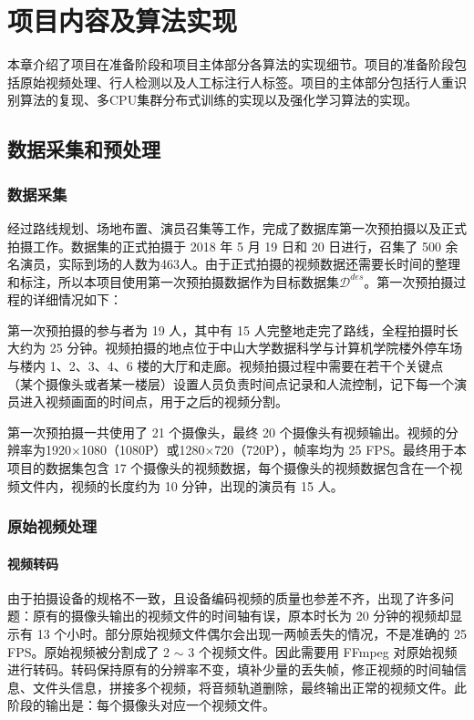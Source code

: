 \chapter{项目内容及算法实现}\label{sec:algorithm}

本章介绍了项目在准备阶段和项目主体部分各算法的实现细节。项目的准备阶段包括原始视频处理、行人检测以及人工标注行人标签。项目的主体部分包括行人重识别算法的复现、多CPU集群分布式训练的实现以及强化学习算法的实现。

\section{数据采集和预处理}

\subsection{数据采集}

经过路线规划、场地布置、演员召集等工作，完成了数据库第一次预拍摄以及正式拍摄工作。数据集的正式拍摄于 2018 年 5 月 19 日和 20 日进行，召集了 500 余名演员，实际到场的人数为463人。由于正式拍摄的视频数据还需要长时间的整理和标注，所以本项目使用第一次预拍摄数据作为目标数据集$\mathcal{D}^{des}$。第一次预拍摄过程的详细情况如下：

第一次预拍摄的参与者为 19 人，其中有 15 人完整地走完了路线，全程拍摄时长大约为 25 分钟。视频拍摄的地点位于中山大学数据科学与计算机学院楼外停车场与楼内 1、2、3、4、6 楼的大厅和走廊。视频拍摄过程中需要在若干个关键点（某个摄像头或者某一楼层）设置人员负责时间点记录和人流控制，记下每一个演员进入视频画面的时间点，用于之后的视频分割。

第一次预拍摄一共使用了 21 个摄像头，最终 20 个摄像头有视频输出。视频的分辨率为1920$\times$1080（1080P）或1280$\times$720（720P），帧率均为 25 FPS。最终用于本项目的数据集包含 17 个摄像头的视频数据，每个摄像头的视频数据包含在一个视频文件内，视频的长度约为 10 分钟，出现的演员有 15 人。

\subsection{原始视频处理}

\subsubsection{视频转码}

由于拍摄设备的规格不一致，且设备编码视频的质量也参差不齐，出现了许多问题：原有的摄像头输出的视频文件的时间轴有误，原本时长为 20 分钟的视频却显示有 13 个小时。部分原始视频文件偶尔会出现一两帧丢失的情况，不是准确的 25 FPS。原始视频被分割成了 2 $\sim$ 3 个视频文件。因此需要用 FFmpeg 对原始视频进行转码。转码保持原有的分辨率不变，填补少量的丢失帧，修正视频的时间轴信息、文件头信息，拼接多个视频，将音频轨道删除，最终输出正常的视频文件。此阶段的输出是：每个摄像头对应一个视频文件。

